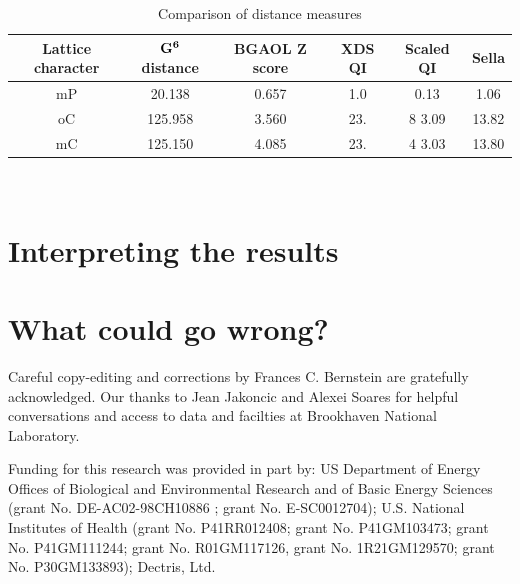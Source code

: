 \documentclass[preprint]{iucr}              %
\newcommand{\GVI}[0]{$\bf{G^{6}}$}
\begin{document}
\begin{table}
	\begin{tabular}{cccccc}
		\toprule
		Lattice character & \GVI{} distance & BGAOL Z score & XDS QI & Scaled QI & Sella \\
		\midrule
		mP               &     20.138  & 0.657    &   1.0  & 0.13  & 1.06\\	
		oC               &     125.958 &  3.560   &    23. & 8 3.09& 13.82\\	
		mC               &     125.150 &  4.085   &    23. & 4 3.03& 13.80\\	
		\bottomrule
	\end{tabular}
	\caption{Comparison of distance measures}
	\label{tab:comparisons}
\end{table}
	~\\
	
	\section{Interpreting the results}
	
	
	\section{What could go wrong?}
	
	
	
	
	
	
	
	
	Careful copy-editing and corrections by Frances C. Bernstein are 
	gratefully acknowledged.  	Our thanks to Jean Jakoncic and Alexei Soares for 
	helpful conversations and access to data and facilties at 
	Brookhaven National Laboratory.
	
	
	Funding for this research was provided in part by: US Department of Energy Offices of Biological and Environmental Research and of Basic Energy Sciences (grant No. DE-AC02-98CH10886 ; grant No. E-SC0012704); U.S. National Institutes of Health (grant No. P41RR012408; grant No. P41GM103473; grant No. P41GM111244; grant No. R01GM117126, grant No. 1R21GM129570; grant No. P30GM133893); Dectris, Ltd.
	
\end{document}
